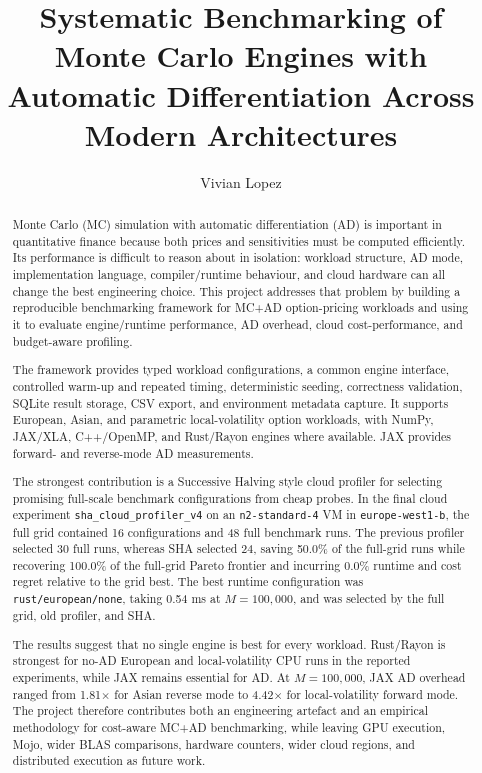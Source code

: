 \documentclass[a4paper, twoside]{report}
\title{Systematic Benchmarking of Monte Carlo Engines with Automatic Differentiation Across Modern Architectures}
\author{Vivian Lopez}
\begin{document}


\begin{abstract}

Monte Carlo (MC) simulation with automatic differentiation (AD) is important in quantitative finance because both prices and sensitivities must be computed efficiently.  Its performance is difficult to reason about in isolation: workload structure, AD mode, implementation language, compiler/runtime behaviour, and cloud hardware can all change the best engineering choice.  This project addresses that problem by building a reproducible benchmarking framework for MC+AD option-pricing workloads and using it to evaluate engine/runtime performance, AD overhead, cloud cost-performance, and budget-aware profiling.

The framework provides typed workload configurations, a common engine interface, controlled warm-up and repeated timing, deterministic seeding, correctness validation, SQLite result storage, CSV export, and environment metadata capture.  It supports European, Asian, and parametric local-volatility option workloads, with NumPy, JAX/XLA, C++/OpenMP, and Rust/Rayon engines where available.  JAX provides forward- and reverse-mode AD measurements.

The strongest contribution is a Successive Halving style cloud profiler for selecting promising full-scale benchmark configurations from cheap probes.  In the final cloud experiment \texttt{sha\_cloud\_profiler\_v4} on an \texttt{n2-standard-4} VM in \texttt{europe-west1-b}, the full grid contained 16 configurations and 48 full benchmark runs.  The previous profiler selected 30 full runs, whereas SHA selected 24, saving 50.0\% of the full-grid runs while recovering 100.0\% of the full-grid Pareto frontier and incurring 0.0\% runtime and cost regret relative to the grid best.  The best runtime configuration was \texttt{rust/european/none}, taking 0.54 ms at \(M=100{,}000\), and was selected by the full grid, old profiler, and SHA.

The results suggest that no single engine is best for every workload.  Rust/Rayon is strongest for no-AD European and local-volatility CPU runs in the reported experiments, while JAX remains essential for AD.  At \(M=100{,}000\), JAX AD overhead ranged from 1.81\(\times\) for Asian reverse mode to 4.42\(\times\) for local-volatility forward mode.  The project therefore contributes both an engineering artefact and an empirical methodology for cost-aware MC+AD benchmarking, while leaving GPU execution, Mojo, wider BLAS comparisons, hardware counters, wider cloud regions, and distributed execution as future work.

\end{abstract}
\end{document}
